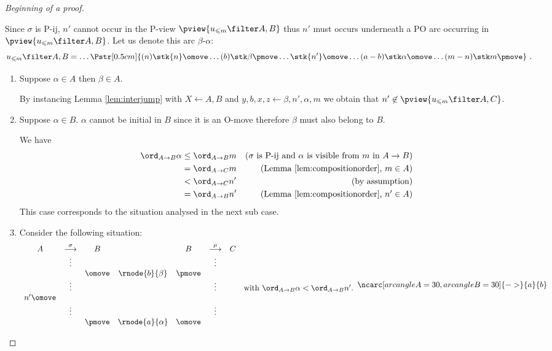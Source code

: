\begin{proof}[Beginning of a proof]
\begin{enumerate}[I.]
\begin{enumerate}
\begin{enumerate}
Since $\sigma$ is P-ij, $n'$ cannot occur in the P-view $\pview{u_{\prefixof m} \filter A,B}$ thus $n'$ must occurs underneath a PO arc occurring in $\pview{u_{\prefixof m} \filter A,B}$. Let us denote this arc $\beta$-$\alpha$:
$$ u_{\prefixof m} \filter A,B = \ldots  
\Pstr[0.5cm]{
 (n){\stk{n} \omove } \ldots (b){\stk\beta \pmove} \ldots \stk{n'} \omove  
\ldots (a-b){\stk\alpha \omove}  \ldots (m-n){\stk m  \pmove }
} \ .
$$

\begin{enumerate}
\item \label{case:mAnAnpAalphaB} Suppose $\alpha \in A$ then $\beta\in A$.

By instancing Lemma \ref{lem:interjump} with
$X\leftarrow A,B$ and $y,b,x,z \leftarrow \beta, n', \alpha, m$ we obtain that $n' \not\in\pview{u_{\prefixof m} \filter A,C}$.


\item Suppose $\alpha \in B$. $\alpha$ cannot be initial in $B$ since it is an O-move therefore $\beta$ must also belong to $B$.

We have
\begin{align}
\ord_{A\rightarrow B} \alpha
 & \leq  \ord_{A\rightarrow B} m 
& \mbox{($\sigma$ is P-ij and $\alpha$ is visible from $m$ in $A\rightarrow B$)}  \nonumber \\
&= \ord_{A\rightarrow C} m 
& \mbox{(Lemma \ref{lem:compositionorder}, $m \in A$)}  \nonumber \\
&<  \ord_{A\rightarrow C} n'  & \mbox{(by assumption)} \nonumber \\
&=  \ord_{A\rightarrow B} n'  & \mbox{(Lemma \ref{lem:compositionorder}, $n' \in A$)}  \nonumber 
\end{align}
This case corresponds to the situation 
analysed in the next sub case.

\item Consider the following situation:
\label{case:situation}
$$ 
\begin{array}{cccccccl}
A & \stackrel\sigma{\longrightarrow} & B & & B & \stackrel\mu{\longrightarrow} & C \\
&\vdots&&& & \vdots\\
&&\omove & \rnode{b}{\beta} & \pmove \\
&\vdots& & &&\vdots && \mbox{with $\ord_{A\rightarrow B} \alpha < \ord_{A\rightarrow B} n'$.} \\
n' \omove && & &  \\
&\vdots& & &&\vdots  \\
&&\pmove & \rnode{a}{\alpha} & \omove \\
\end{array}
\ncarc[arcangleA=30,arcangleB=30]{->}{a}{b}
 $$  


\end{enumerate}
\end{enumerate}
\end{enumerate}
\end{enumerate}
\end{proof}
